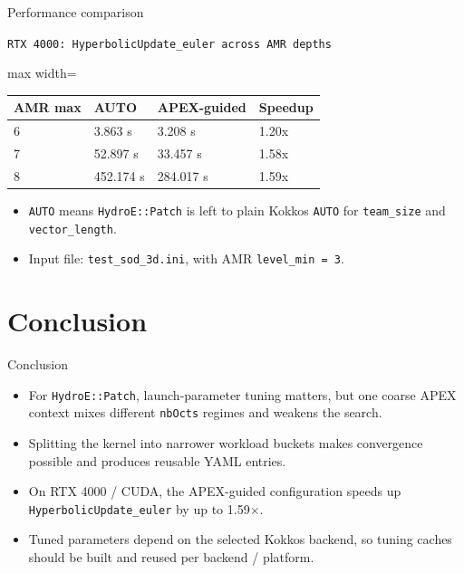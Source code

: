 \documentclass[11pt]{beamer}
\begin{document}
\begin{frame}[t,shrink=5]{Performance comparison}
\begin{beamerboxesrounded}[upper=profiler title,lower=profiler body,width=\linewidth,shadow=false]{%
\texttt{\scriptsize RTX 4000: HyperbolicUpdate\_euler across AMR depths}}
{\scriptsize
\begin{adjustbox}{max width=\linewidth}
\begin{tabular}{@{}llll@{}}
\toprule
AMR max & AUTO & APEX-guided & Speedup \\
\midrule
6 & 3.863 s & 3.208 s & 1.20x \\
7 & 52.897 s & 33.457 s & 1.58x \\
8 & 452.174 s & 284.017 s & 1.59x \\
\bottomrule
\end{tabular}
\end{adjustbox}}
\end{beamerboxesrounded}

\vspace{0.15em}
{\scriptsize
\begin{itemize}\itemsep0.08em
  \item \texttt{AUTO} means \texttt{HydroE::Patch} is left to plain Kokkos \texttt{AUTO} for \texttt{team\_size} and \texttt{vector\_length}.
  \item Input file: \texttt{test\_sod\_3d.ini}, with AMR \texttt{level\_min = 3}.
\end{itemize}}
\end{frame}

\section*{Conclusion}

\begin{frame}[t]{Conclusion}
\small
\begin{itemize}\itemsep0.35em
  \item For \texttt{HydroE::Patch}, launch-parameter tuning matters, but one coarse APEX context mixes different \texttt{nbOcts} regimes and weakens the search.
  \item Splitting the kernel into narrower workload buckets makes convergence possible and produces reusable YAML entries.
  \item On RTX 4000 / CUDA, the APEX-guided configuration speeds up \texttt{HyperbolicUpdate\_euler} by up to 1.59×.
  \item Tuned parameters depend on the selected Kokkos backend, so tuning caches should be built and reused per backend / platform.
\end{itemize}
\end{frame}
\end{document}
